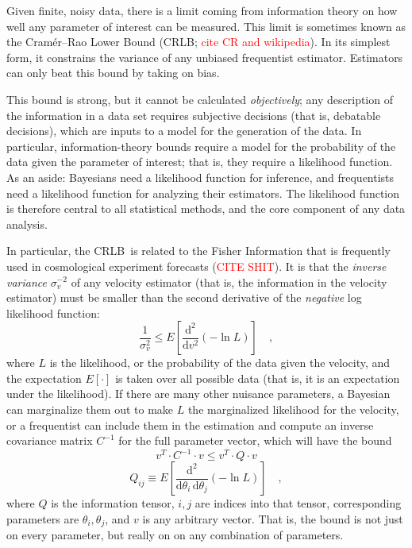\documentclass[modern]{aastex61}
\newcommand{\dd}{\mathrm{d}}
\newcommand{\todo}[1]{\textcolor{red}{#1}}  %
\newcommand{\acronym}[1]{{\small{#1}}}
\newcommand{\CRLB}{\acronym{CRLB}}
\begin{document}
Given finite, noisy data, there is a limit coming from information
theory on how well any parameter of interest can be measured.
This limit is
sometimes known as the Cram\'er--Rao Lower Bound (\CRLB; \todo{cite CR and wikipedia}).
In its simplest form, it constrains the variance of any unbiased
frequentist estimator.
Estimators can only beat this bound by taking on bias.

This bound is strong, but it cannot be calculated \emph{objectively};
any description of the information in a data set requires
subjective decisions (that is, debatable decisions), which are inputs
to a model for the generation of the data.
In particular, information-theory bounds require a model for the
probability of the data given the parameter of interest; that is, they
require a likelihood function.
As an aside: Bayesians need a likelihood function for inference, and
frequentists need a likelihood function for analyzing their estimators.
The likelihood function is therefore central to all statistical methods,
and the core component of any data analysis.

In particular, the \CRLB\ is related to the Fisher Information that is
frequently used in cosmological experiment forecasts (\todo{CITE
  SHIT}).
It is that the \emph{inverse variance} $\sigma_v^{-2}$ of any velocity
estimator (that is, the information in the velocity estimator) must be smaller than the
second derivative of the \emph{negative} log likelihood function:
\begin{equation}
\frac{1}{\sigma_v^2} \leq E\left[\frac{\dd^2}{\dd v^2}(-\ln L)\right] \quad,
\end{equation}
where $L$ is the likelihood, or the probability of the data given the velocity,
and the expectation $E[\cdot]$ is taken over all possible data (that is, it is an
expectation under the likelihood).
If there are many other nuisance parameters, a Bayesian can marginalize them
out to make $L$ the marginalized likelihood for the velocity, or a frequentist
can include them in the estimation and compute an inverse covariance matrix $C^{-1}$
for the full parameter vector, which will have the bound
\begin{equation}
v^T\cdot C^{-1}\cdot v \leq v^T\cdot Q\cdot v
\end{equation}
\begin{equation}
Q_{ij} \equiv E\left[\frac{\dd^2}{\dd\theta_i\,\dd\theta_j}(-\ln L)\right] \quad,
\end{equation}
where $Q$ is the information tensor, $i,j$ are indices into that
tensor, corresponding parameters are $\theta_i, \theta_j$, and $v$ is
any arbitrary vector.  That is, the bound is not just on every
parameter, but really on on any combination of parameters.
\end{document}
